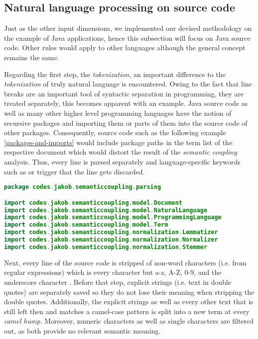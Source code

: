 \documentclass[12pt,a4paper]{report}
\begin{document}
\subsection{Natural language processing on source code}

Just as the other input dimensions, we implemented our devised methodology
on the example of Java applications, hence this subsection will focus on
Java source code. Other rules would apply to other languages although
the general concept remains the same.

Regarding the first step, the \textit{tokenization}, an important difference to
the \textit{tokenization} of truly natural language is encountered.
Owing to the fact that line breaks are an important tool of syntactic separation
in programming, they are treated separately, this becomes apparent with an example.
Java source code as well as many other higher level programming languages have
the notion of recursive packages and importing them or parts of them into the
source code of other packages.
Consequently, source code such as the following example \ref{packages-and-imports}
would include package paths in the term list of the respective document
which would distort the result of the \textit{semantic coupling} analysis.
Thus, every line is parsed separately and language-specific keywords such as
 or  trigger that the line gets discarded.

\smaller
\begin{lstlisting}[caption=Packages and imports in Java, label=packages-and-imports, language=Java, breaklines=true]
package codes.jakob.semanticcoupling.parsing

import codes.jakob.semanticcoupling.model.Document
import codes.jakob.semanticcoupling.model.NaturalLanguage
import codes.jakob.semanticcoupling.model.ProgrammingLanguage
import codes.jakob.semanticcoupling.model.Term
import codes.jakob.semanticcoupling.normalization.Lemmatizer
import codes.jakob.semanticcoupling.normalization.Normalizer
import codes.jakob.semanticcoupling.normalization.Stemmer
\end{lstlisting}
\normalsize

Next, every line of the source code is stripped of non\hyp word characters
(i.e.  from regular expressions) which is every character
but a-z, A-Z, 0-9, and the underscore character \cite{ieee1992posix}.
Before that step, explicit strings (i.e. text in double quotes) are separately
saved so they do not lose their meaning when stripping the double quotes.
Additionally, the explicit strings as well as every other text that is still
left then and matches a camel-case pattern is split into a new term at every
\textit{camel hump}. Moreover, numeric characters as well as single characters
are filtered out, as both provide no relevant semantic meaning.
\end{document}
